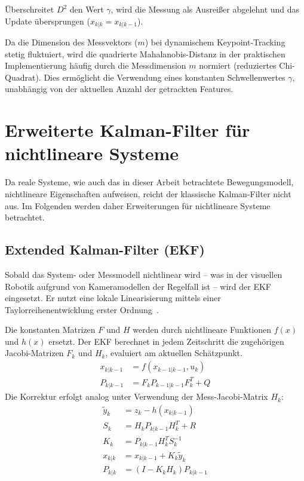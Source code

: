 Überschreitet $D^2$ den Wert $\gamma$, wird die Messung als Ausreißer abgelehnt und das Update übersprungen ($x_{k|k} = x_{k|k-1}$).

Da die Dimension des Messvektors ($m$) bei dynamischem Keypoint-Tracking stetig fluktuiert, wird die quadrierte Mahalanobis-Distanz in der praktischen Implementierung häufig durch die Messdimension $m$ normiert (reduziertes Chi-Quadrat). Dies ermöglicht die Verwendung eines konstanten Schwellenwertes $\gamma$, unabhängig von der aktuellen Anzahl der getrackten Features.

\newpage
\section{Erweiterte Kalman-Filter für nichtlineare Systeme}
\label{sec:ErweiterteKalmanFilter}
Da reale Systeme, wie auch das in dieser Arbeit betrachtete Bewegungsmodell, nichtlineare Eigenschaften aufweisen, reicht der klassische Kalman-Filter nicht aus. Im Folgenden werden daher Erweiterungen für nichtlineare Systeme betrachtet.

\subsection{Extended Kalman-Filter (EKF)}
\label{subsec:EKF}
Sobald das System- oder Messmodell nichtlinear wird -- was in der visuellen Robotik aufgrund von Kameramodellen der Regelfall ist -- wird der \ac{EKF} eingesetzt. Er nutzt eine lokale Linearisierung mittels einer Taylorreihenentwicklung erster Ordnung~\cite{thrun2005probabilistic}.

Die konstanten Matrizen $F$ und $H$ werden durch nichtlineare Funktionen $f(x)$ und $h(x)$ ersetzt. Der \ac{EKF} berechnet in jedem Zeitschritt die zugehörigen Jacobi-Matrizen $F_k$ und $H_k$, evaluiert am aktuellen Schätzpunkt.
\begin{align}
    x_{k|k-1} &= f(x_{k-1|k-1}, u_k) \\
    P_{k|k-1} &= F_k P_{k-1|k-1} F_k^T + Q
\end{align}
Die Korrektur erfolgt analog unter Verwendung der Mess-Jacobi-Matrix $H_k$:
\begin{align}
    \tilde{y}_k &= z_k - h(x_{k|k-1}) \\
    S_k &= H_k P_{k|k-1} H_k^T + R \\
    K_k &= P_{k|k-1} H_k^T S_k^{-1} \\
    x_{k|k} &= x_{k|k-1} + K_k \tilde{y}_k \\
    P_{k|k} &= (I - K_k H_k) P_{k|k-1}
\end{align}

